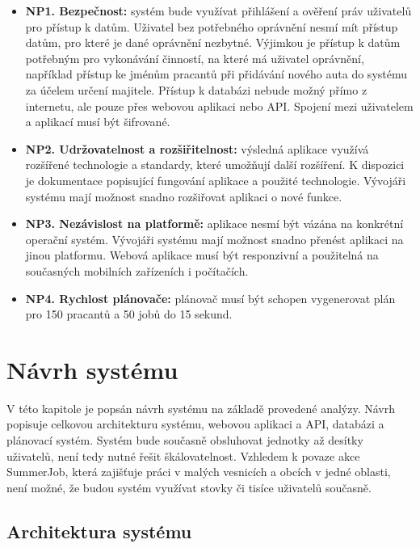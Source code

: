 \begin{itemize}
    \item \textbf{NP1. Bezpečnost:} systém bude využívat přihlášení a ověření práv uživatelů pro přístup k datům. Uživatel bez potřebného oprávnění nesmí mít přístup datům, pro které je dané oprávnění nezbytné. Výjimkou je přístup k datům potřebným pro vykonávání činností, na které má uživatel oprávnění, například přístup ke jménům pracantů při přidávání nového auta do systému za účelem určení majitele. Přístup k databázi nebude možný přímo z internetu, ale pouze přes webovou aplikaci nebo API. Spojení mezi uživatelem a aplikací musí být šifrované.
    \item \textbf{NP2. Udržovatelnost a rozšiřitelnost:} výsledná aplikace využívá rozšířené technologie a standardy, které umožňují další rozšíření. K dispozici je dokumentace popisující fungování aplikace a použité technologie. Vývojáři systému mají možnost snadno rozšiřovat aplikaci o nové funkce.
    \item \textbf{NP3. Nezávislost na platformě:} aplikace nesmí být vázána na konkrétní operační systém. Vývojáři systému mají možnost snadno přenést aplikaci na jinou platformu. Webová aplikace musí být responzivní a použitelná na současných mobilních zařízeních i počítačích.
    \item \textbf{NP4. Rychlost plánovače:} plánovač musí být schopen vygenerovat plán pro 150 pracantů a 50 jobů do 15 sekund.
\end{itemize}

\section{Návrh systému}

V této kapitole je popsán návrh systému na základě provedené analýzy. Návrh popisuje celkovou architekturu systému, webovou aplikaci a API, databázi a plánovací systém.
Systém bude současně obsluhovat jednotky až desítky uživatelů, není tedy nutné řešit škálovatelnost. Vzhledem k povaze akce SummerJob, která zajišťuje práci
v malých vesnicích a obcích v jedné oblasti, není možné, že budou systém využívat stovky či tisíce uživatelů současně.

\subsection{Architektura systému}

